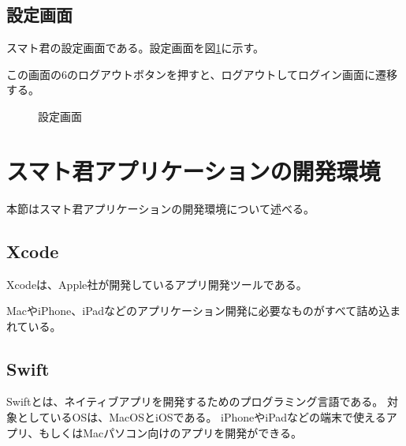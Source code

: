 \documentclass[a4j,12pt,onecolumn,oneside,titlepage,openany,final]{jreport}
\begin{document}
\subsection{設定画面}
スマト君の設定画面である。設定画面を図\ref{set}に示す。

この画面の6のログアウトボタンを押すと、ログアウトしてログイン画面に遷移する。


\begin{figure}[htbp]
  \centering %
  \caption{設定画面}\label{set}
\end{figure}

\section{スマト君アプリケーションの開発環境}\label{rihabiri_jisso}
本節はスマト君アプリケーションの開発環境について述べる。

\subsection{Xcode}
Xcode\cite{xcode}は、Apple社が開発しているアプリ開発ツールである。

MacやiPhone、iPadなどのアプリケーション開発に必要なものがすべて詰め込まれている。


\subsection{Swift}
Swift\cite{swift}とは、ネイティブアプリを開発するためのプログラミング言語である。
対象としているOSは、MacOSとiOSである。
iPhoneやiPadなどの端末で使えるアプリ、もしくはMacパソコン向けのアプリを開発ができる。
\end{document}
